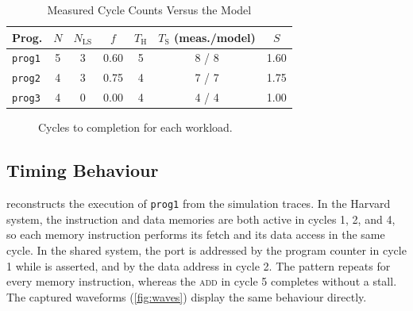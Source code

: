 \documentclass[conference]{IEEEtran}
\newcommand{\NLS}{N_{\mathrm{LS}}}
\newcommand{\Tharv}{T_{\mathrm{H}}}
\newcommand{\Tshr}{T_{\mathrm{S}}}
\newcommand{\sig}[1]{\texttt{\detokenize{#1}}}
\begin{document}
\begin{table}[t]
\centering
\caption{Measured Cycle Counts Versus the Model}
\label{tab:results}
\footnotesize
\begin{tabular}{@{}l c c c c c c@{}}
\toprule
Prog. & $N$ & $\NLS$ & $f$ & $\Tharv$ & $\Tshr$ (meas./model) & $S$ \\
\midrule
\texttt{prog1} & 5 & 3 & 0.60 & 5 & 8 / 8 & 1.60 \\
\texttt{prog2} & 4 & 3 & 0.75 & 4 & 7 / 7 & 1.75 \\
\texttt{prog3} & 4 & 0 & 0.00 & 4 & 4 / 4 & 1.00 \\
\bottomrule
\end{tabular}
\end{table}

\begin{figure}[t]
\centering
{}
\caption{Cycles to completion for each workload.}
\label{fig:bars}
\end{figure}

\subsection{Timing Behaviour}
 reconstructs the execution of \texttt{prog1} from the simulation traces. In the
Harvard system, the instruction and data memories are both active in cycles 1, 2, and 4, so each
memory instruction performs its fetch and its data access in the same cycle. In the shared system,
the port is addressed by the program counter in cycle 1 while \sig{stall} is asserted, and by the
data address in cycle 2. The pattern repeats for every memory instruction, whereas the \textsc{add}
in cycle 5 completes without a stall. The captured waveforms (\cref{fig:waves}) display the same
behaviour directly.
\end{document}
